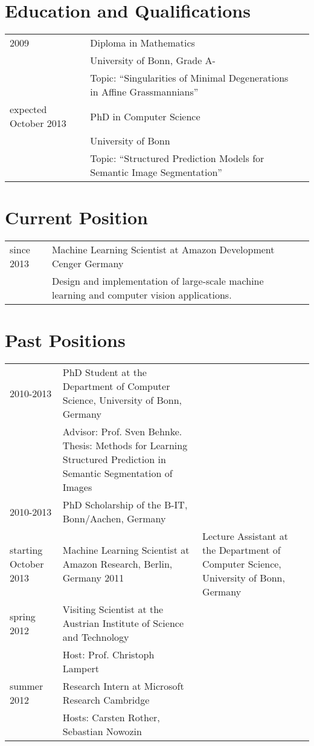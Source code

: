 \documentclass[a4paper,11pt]{article}
\begin{document}
\maketitle

\section{Education and Qualifications}
\begin{tabular}{lll}
    2009 & Diploma in Mathematics \\ & University of Bonn, Grade A-\\
         & Topic: ``Singularities of Minimal Degenerations in Affine Grassmannians'' \\
    expected October 2013 & PhD in Computer Science \\ & University of Bonn \\
         & Topic: ``Structured Prediction Models for Semantic Image Segmentation''
\end{tabular}

\section{Current Position}
\begin{tabular}{lll}
    since 2013 & Machine Learning Scientist at Amazon Development Cenger Germany\\
               & Design and implementation of large-scale machine learning and computer vision applications.
\end{tabular}

\section{Past Positions}
\begin{tabular}{lll}
    2010-2013 & PhD Student at the Department of Computer Science, University of Bonn, Germany\\
         & Advisor: Prof. Sven Behnke. Thesis: Methods for Learning Structured Prediction in Semantic Segmentation of Images\\
    2010-2013 & PhD Scholarship of the B-IT, Bonn/Aachen, Germany\\
    starting October 2013& Machine Learning Scientist at Amazon Research, Berlin, Germany
    2011 & Lecture Assistant at the Department of Computer Science, University of Bonn, Germany \\
    spring 2012 & Visiting Scientist at the Austrian Institute of Science and Technology\\
               & Host: Prof. Christoph Lampert\\
    summer 2012 & Research Intern at Microsoft Research Cambridge\\
               & Hosts: Carsten Rother, Sebastian Nowozin\\
\end{tabular}
\end{document}
